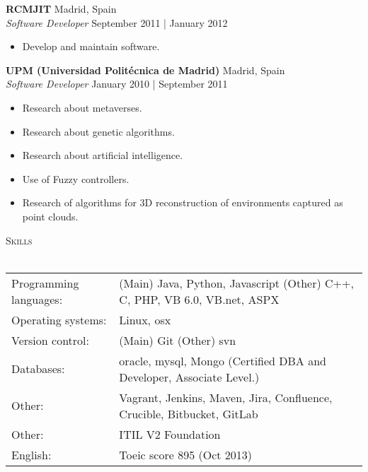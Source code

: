 \documentclass[a4paper]{article}
\newcommand{\lineunder} {
    \vspace*{-8pt} \\
    \hspace*{-18pt} \hrulefill \\
}
\newcommand{\header} [1] {
    {\hspace*{-18pt}\vspace*{6pt} \textsc{#1}}
    \vspace*{-6pt} \lineunder
}
\begin{document}
\textbf{RCMJIT} \hfill Madrid, Spain\\
\textit{Software Developer} \hfill September 2011 | January 2012\\
\vspace{-1mm}
\begin{itemize} \itemsep 1pt
	\item Develop and maintain software.
\end{itemize}

\textbf{UPM (Universidad Politécnica de Madrid)} \hfill Madrid, Spain\\
\textit{Software Developer} \hfill January 2010 | September 2011\\
\vspace{-1mm}
\begin{itemize} \itemsep 1pt
	\item Research about metaverses.
	\item Research about genetic algorithms.
	\item Research about artificial intelligence.
	\item Use of Fuzzy controllers.
	\item Research of algorithms for 3D reconstruction of environments captured as point clouds.
\end{itemize}

\header{Skills}
\begin{tabular}{ l l }
	Programming languages: & (Main) Java, Python, Javascript (Other) C++, C, PHP, VB 6.0, VB.net, ASPX \\
	Operating systems:     & Linux, osx                                                                \\
	Version control:       & (Main) Git (Other) svn                                                    \\
	Databases:             & oracle, mysql, Mongo (Certified DBA and Developer, Associate Level.)      \\
	Other:                 & Vagrant, Jenkins, Maven, Jira, Confluence, Crucible, Bitbucket, GitLab    \\
	Other:                 & ITIL V2 Foundation                                                        \\
	English:               & Toeic score 895 (Oct 2013)                                                \\
\end{tabular}

\vspace*{2mm}
\end{document}
